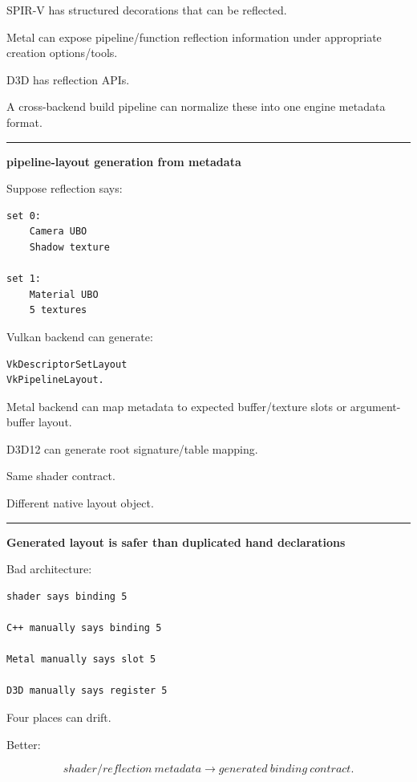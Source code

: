 SPIR-V has structured decorations that can be reflected.

Metal can expose pipeline/function reflection information under appropriate creation options/tools.

D3D has reflection APIs.

A cross-backend build pipeline can normalize these into one engine metadata format.

\begin{center}\rule{0.5\linewidth}{0.5pt}\end{center}

\textbf{pipeline-layout generation from metadata}

Suppose reflection says:

\begin{verbatim}
set 0:
    Camera UBO
    Shadow texture

set 1:
    Material UBO
    5 textures
\end{verbatim}

Vulkan backend can generate:

\begin{verbatim}
VkDescriptorSetLayout
VkPipelineLayout.
\end{verbatim}

Metal backend can map metadata to expected buffer/texture slots or argument-buffer layout.

D3D12 can generate root signature/table mapping.

Same shader contract.

Different native layout object.

\begin{center}\rule{0.5\linewidth}{0.5pt}\end{center}

\textbf{Generated layout is safer than duplicated hand declarations}

Bad architecture:

\begin{verbatim}
shader says binding 5

C++ manually says binding 5

Metal manually says slot 5

D3D manually says register 5
\end{verbatim}

Four places can drift.

Better:

\[
shader/reflection\ metadata
\rightarrow
generated\ binding\ contract.
\]

